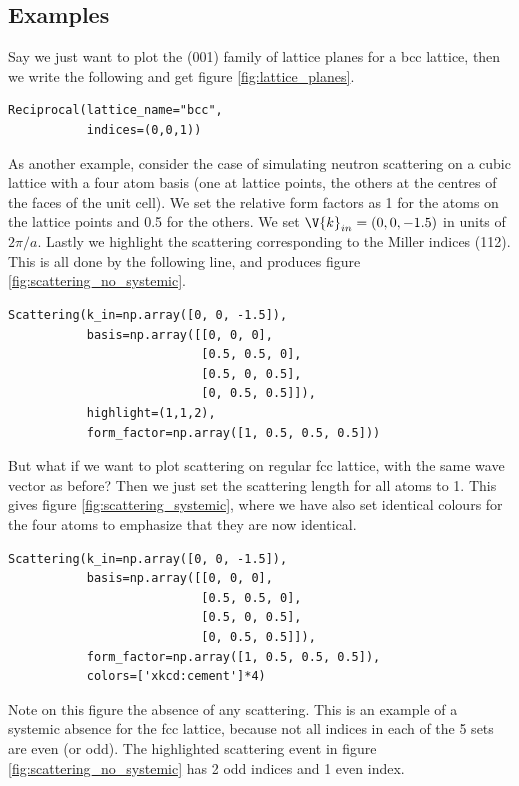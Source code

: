 \documentclass[main.tex]{subfiles}
\begin{document}
	\subsection{Examples}
	Say we just want to plot the (001) family of lattice planes for a bcc lattice, then we write the following and get figure \ref{fig:lattice_planes}.
\begin{lstlisting}
Reciprocal(lattice_name="bcc",
		   indices=(0,0,1))
\end{lstlisting}
	As another example, consider the case of simulating neutron scattering on a cubic lattice with a four atom basis (one at lattice points, the others at the centres of the faces of the unit cell). We set the relative form factors as 1 for the atoms on the lattice points and 0.5 for the others. We set $ \V{k}_{in} = (0, 0, -1.5)$ in units of $ 2\pi/a $. Lastly we highlight the scattering corresponding to the Miller indices (112). This is all done by the following line, and produces figure \ref{fig:scattering_no_systemic}.
\begin{lstlisting}
Scattering(k_in=np.array([0, 0, -1.5]),
		   basis=np.array([[0, 0, 0], 
						   [0.5, 0.5, 0],
						   [0.5, 0, 0.5],
						   [0, 0.5, 0.5]]),	
		   highlight=(1,1,2),
		   form_factor=np.array([1, 0.5, 0.5, 0.5]))
\end{lstlisting}
	But what if we want to plot scattering on regular fcc lattice, with the same wave vector as before? Then we just set the scattering length for all atoms to 1. This gives figure \ref{fig:scattering_systemic}, where we have also set identical colours for the four atoms to emphasize that they are now identical.
\begin{lstlisting}
Scattering(k_in=np.array([0, 0, -1.5]),
		   basis=np.array([[0, 0, 0], 
						   [0.5, 0.5, 0],
						   [0.5, 0, 0.5],
						   [0, 0.5, 0.5]]),	
		   form_factor=np.array([1, 0.5, 0.5, 0.5]),
		   colors=['xkcd:cement']*4)
\end{lstlisting}
	Note on this figure the absence of any scattering. This is an example of a systemic absence for the fcc lattice, because not all indices in each of the 5 sets are even (or odd). The highlighted scattering event in figure \ref{fig:scattering_no_systemic} has 2 odd indices and 1 even index.
	
\end{document}
